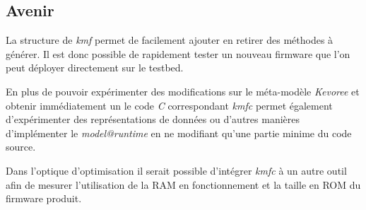 \subsection*{Avenir}
{}

La structure de \emph{kmf} permet de facilement ajouter en retirer des méthodes à générer. Il est donc possible de rapidement tester un nouveau firmware que l'on peut déployer directement sur le testbed.

En plus de pouvoir expérimenter des modifications sur le méta-modèle \emph{Kevoree} et obtenir immédiatement un le code \emph{C} correspondant \emph{kmfc} permet également d'expérimenter des représentations de données ou d'autres manières d'implémenter le \emph{model@runtime} en ne modifiant qu'une partie minime du code source.


Dans l'optique d'optimisation il serait possible d'intégrer \emph{kmfc} à un autre outil afin de mesurer l'utilisation de la RAM en fonctionnement et la taille en ROM du firmware produit.